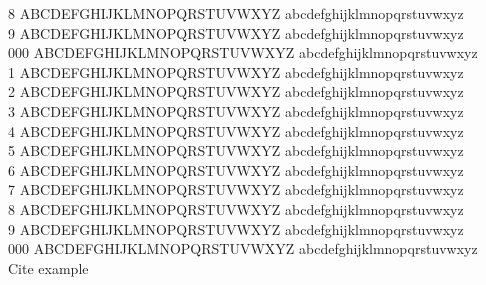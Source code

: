 \documentclass[doctor,english,final]{postech-ucs}
\begin{document}
8 ABCDEFGHIJKLMNOPQRSTUVWXYZ abcdefghijklmnopqrstuvwxyz \\
9 ABCDEFGHIJKLMNOPQRSTUVWXYZ abcdefghijklmnopqrstuvwxyz \\
000 ABCDEFGHIJKLMNOPQRSTUVWXYZ abcdefghijklmnopqrstuvwxyz \\
1 ABCDEFGHIJKLMNOPQRSTUVWXYZ abcdefghijklmnopqrstuvwxyz \\
2 ABCDEFGHIJKLMNOPQRSTUVWXYZ abcdefghijklmnopqrstuvwxyz \\
3 ABCDEFGHIJKLMNOPQRSTUVWXYZ abcdefghijklmnopqrstuvwxyz \\
4 ABCDEFGHIJKLMNOPQRSTUVWXYZ abcdefghijklmnopqrstuvwxyz \\
5 ABCDEFGHIJKLMNOPQRSTUVWXYZ abcdefghijklmnopqrstuvwxyz \\
6 ABCDEFGHIJKLMNOPQRSTUVWXYZ abcdefghijklmnopqrstuvwxyz \\
7 ABCDEFGHIJKLMNOPQRSTUVWXYZ abcdefghijklmnopqrstuvwxyz \\
8 ABCDEFGHIJKLMNOPQRSTUVWXYZ abcdefghijklmnopqrstuvwxyz \\
9 ABCDEFGHIJKLMNOPQRSTUVWXYZ abcdefghijklmnopqrstuvwxyz \\
000 ABCDEFGHIJKLMNOPQRSTUVWXYZ abcdefghijklmnopqrstuvwxyz \\
Cite example\cite{Moin1998}

\begin{summarykorean}

\end{summarykorean}






\acknowledgement[korean]


\curriculumvitae[korean]

    \begin{personaldata}
    \end{personaldata}
\end{document}
